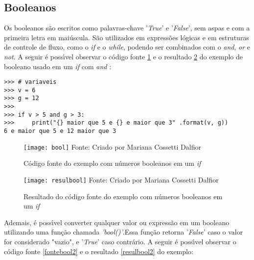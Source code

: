 		\subsection{Booleanos}
 Os booleanos s\~{a}o escritos como palavras-chave '\textsl{True}' e '\textsl{False}', sem aspas e com a primeira letra em mai\'{u}scula. S\~{a}o utilizados em express\~{o}es l\'{o}gicas e em estruturas de controle de fluxo, como o \textsl{if} e o \textsl{while}, podendo ser combinados com o \textsl{and}, \textsl{or} e \textsl{not}. A seguir \'{e} poss\'{\i}vel observar o c\'{o}digo fonte \ref{fontebool} e o resultado \ref{resulbool} do exemplo de booleano usado em um \textsl{if} com \textsl{and} :

\begin{lstlisting}
>>> # variaveis
>>> v = 6
>>> g = 12
>>> 
>>> if v > 5 and g > 3:
>>> 	print("{} maior que 5 e {} e maior que 3" .format(v, g))
6 e maior que 5 e 12 maior que 3
\end{lstlisting}

\begin{figure}[H]
	\begin{center}
		\caption{C\'{o}digo fonte do exemplo com n\'{u}meros booleanos em um \textsl{if}} \label{fontebool}
		\texttt{[image: bool]} 
		\newline
		Fonte: Criado por Mariana Cossetti Dalfior
	\end{center}
\end{figure}

\begin{figure}[H]
	\begin{center}
		\caption{Resultado do c\'{o}digo fonte do exemplo com n\'{u}meros booleanos em um \textsl{if}} \label{resulbool}
		\texttt{[image: resulbool]} 
		\newline
		Fonte: Criado por Mariana Cossetti Dalfior
	\end{center}
\end{figure}

Ademais,  \'{e} poss\'{\i}vel converter qualquer valor ou express\~{a}o em um booleano utilizando uma fun\c{c}\~{a}o chamada \textsl{'bool()'}.Essa fun\c{c}\~{a}o retorna '\textsl{False}' caso o valor for considerado "vazio", e '\textsl{True}' caso contr\'{a}rio. A seguir \'{e} poss\'{\i}vel observar o c\'{o}digo fonte \ref{fontebool2} e o resultado \ref{resulbool2} do exemplo: 

